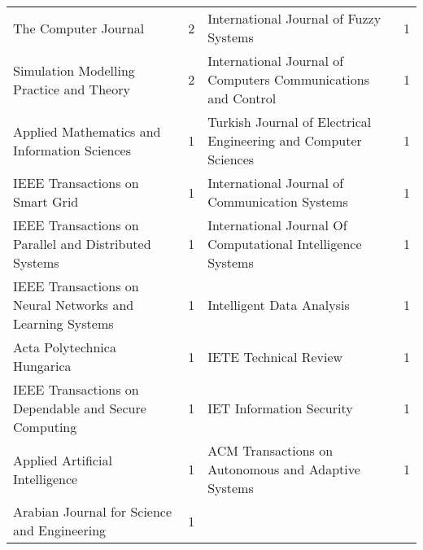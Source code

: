 \begin{table*}[!ht]
\begin{adjustbox}{max width=\textwidth}
\begin{tabular}{llll}
The Computer Journal & 2 & International Journal of Fuzzy Systems & 1   \\ 
Simulation Modelling Practice and Theory & 2 & International Journal of Computers Communications and Control & 1   \\ 
Applied Mathematics and Information Sciences & 1 & Turkish Journal of Electrical Engineering and Computer Sciences & 1   \\ 
IEEE Transactions on Smart Grid & 1 & International Journal of Communication Systems & 1   \\ 
IEEE Transactions on Parallel and Distributed Systems & 1 & International Journal Of Computational Intelligence Systems & 1   \\ 
IEEE Transactions on Neural Networks and Learning Systems & 1 & Intelligent Data Analysis & 1   \\ 
Acta Polytechnica Hungarica & 1 & IETE Technical Review & 1   \\ 
IEEE Transactions on Dependable and Secure Computing & 1 & IET Information Security & 1   \\ 
Applied Artificial Intelligence & 1 & ACM Transactions on Autonomous and Adaptive Systems & 1   \\ 
Arabian Journal for Science and Engineering & 1 &  &    \\ 


\bottomrule

\end{tabular}

\end{adjustbox}

\end{table*}
